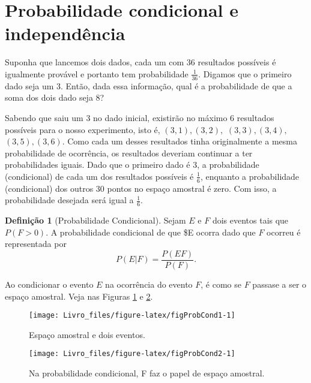 \documentclass[]{book}
\theoremstyle{definition}
\newtheorem{definition}{Definição}[chapter]
\theoremstyle{definition}
\theoremstyle{definition}
\theoremstyle{remark}
\begin{document}
\hypertarget{probabilidade-condicional-e-independuxeancia}{%
\section{Probabilidade condicional e independência}\label{probabilidade-condicional-e-independuxeancia}}

Suponha que lancemos dois dados, cada um com 36 resultados possíveis é igualmente provável e portanto tem probabilidade \(\frac{1}{36}\).
Digamos que o primeiro dado seja um 3.
Então, dada essa informação, qual é a probabilidade de que a soma dos dois dado seja 8?

Sabendo que saiu um 3 no dado inicial, existirão no máximo 6 resultados possíveis para o nosso experimento, isto é, \((3,1), (3,2),\) \((3,3), (3,4),\) \((3,5), (3,6)\).
Como cada um desses resultados tinha originalmente a mesma probabilidade de ocorrência, os resultados deveriam continuar a ter probabilidades iguais.
Dado que o primeiro dado é 3, a probabilidade (condicional) de cada um dos resultados possíveis é \(\frac{1}{6}\), enquanto a probabilidade (condicional) dos outros 30 pontos no espaço amostral é zero.
Com isso, a probabilidade desejada será igual a \(\frac{1}{6}\).

\begin{definition}[Probabilidade Condicional]
\protect\hypertarget{def:defProbCond}{}{\label{def:defProbCond} \iffalse (Probabilidade Condicional) \fi{} }Sejam \(E\) e \(F\) dois eventos tais que \(P(F>0)\).
A probabilidade condicional de que \$E ocorra dado que \(F\) ocorreu é representada por
\begin{equation}
P(E|F) = \frac{P(EF)}{P(F)}.
\label{eq:condicional}
\end{equation}
\end{definition}

Ao condicionar o evento \(E\) na ocorrência do evento \(F\), é como se \(F\) passase a ser o espaço amostral.
Veja nas Figuras \ref{fig:figProbCond1} e \ref{fig:figProbCond2}.

\begin{figure}

{\centering \texttt{[image: Livro\_files/figure-latex/figProbCond1-1]} 

}

\caption{Espaço amostral e dois eventos.}\label{fig:figProbCond1}
\end{figure}

\begin{figure}

{\centering \texttt{[image: Livro\_files/figure-latex/figProbCond2-1]} 

}

\caption{Na probabilidade condicional, F faz o papel de espaço amostral.}\label{fig:figProbCond2}
\end{figure}
\end{document}
